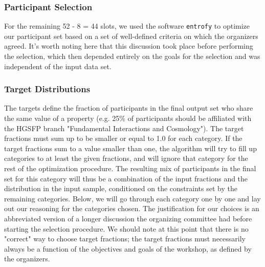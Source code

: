 \subsubsection*{Participant Selection}
For the remaining 52 - 8 = 44 slots, we used the software \texttt{entrofy} to optimize our participant set based on a set of well-defined criteria on which the organizers agreed. It's worth noting here that this discussion took place before performing the selection, which then depended entirely on the goals for the selection and was independent of the input data set. 

\subsubsection*{Target Distributions}
The targets define the fraction of participants in the final output set who share the same value of a property (e.g. 25\% of participants should be affiliated with the HGSFP branch "Fundamental Interactions and Cosmology"). The target fractions must sum up to be smaller or equal to 1.0 for each category. If the target fractions sum to a value smaller than one, the algorithm will try to fill up categories to at least the given fractions, and will ignore that category for the rest of the optimization procedure. The resulting mix of participants in the final set for this category will thus be a combination of the input fractions and the distribution in the input sample, conditioned on the constraints set by the remaining categories. Below, we will go through each category one by one and lay out our reasoning for the categories chosen. The justification for our choices is an abbreviated version of a longer discussion the organizing committee had before starting the selection procedure. We should note at this point that there is no "correct" way to choose target fractions; the target fractions must necessarily always be a function of the objectives and goals of the workshop, as defined by the organizers.

